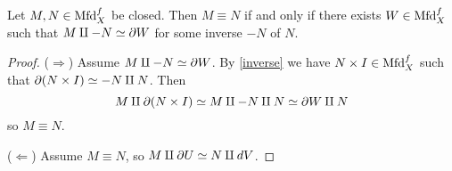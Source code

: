 \begin{proposition}
  Let $M,N \in \mathrm{Mfd}^f_X$ be closed. Then $M \equiv N$ if and
  only if there exists $W \in \mathrm{Mfd}^f_X$ such that $M \amalg -N
  \simeq \partial W$ for some inverse $-N$ of $N$.
\end{proposition}

\begin{proof}
  ($\Rightarrow$) Assume $M \amalg -N \simeq \partial W$. By \eqref{inverse}
  we have $N \times I \in \mathrm{Mfd}^f_X$ such that
  $\partial(N \times I) \simeq -N \amalg N$. Then
  \[
  M \amalg \partial(N \times I) \simeq M \amalg -N \amalg N \simeq \partial W
  \amalg N
  \]
  so $M \equiv N$.

  ($\Leftarrow$) Assume $M \equiv N$, so $M \amalg \partial U \simeq N
  \amalg d V$.
\end{proof}






